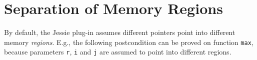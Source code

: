 \documentclass[a4paper,11pt,twoside,openright]{report}
\begin{document}




\chapter{Separation of Memory Regions}

By default, the Jessie plug-in assumes different pointers point into
different memory \textit{regions}.  E.g., the following postcondition
can be proved on function \verb|max|, because parameters \verb|r|,
\verb|i| and \verb|j| are assumed to point into different regions.
\end{document}
